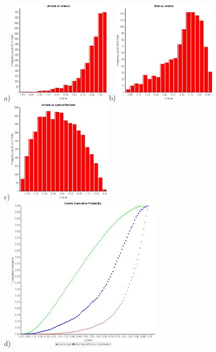 \begin{figure}[htbp]
\centering %
a)\includegraphics[width=2in,height=2in]{fig/lens/cosine_unmod_vs_unmod.png}
b)\includegraphics[width=2in,height=2in]{fig/lens/cosine_mod_vs_unmod.png}
c)\includegraphics[width=2in,height=2in]{fig/lens/cosine_random_unmod.png}\\
d)\includegraphics[width=3in,height=3in]{fig/lens/cosine_cumulative_probablility.png}

\end{figure}
